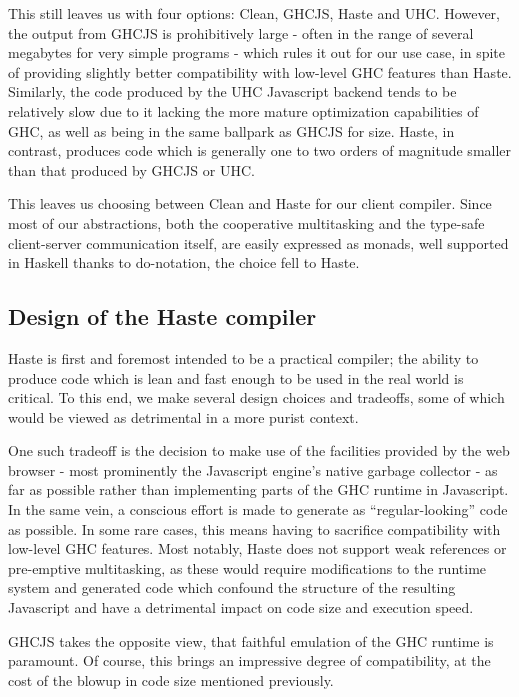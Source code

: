 \documentclass[preprint]{sigplanconf}
\begin{document}
This still leaves us with four options: Clean, GHCJS, Haste and UHC. However,
the output from GHCJS is prohibitively large - often in the range of several
megabytes for very simple programs - which rules it out for our use case, in
spite of providing slightly better compatibility with low-level GHC features
than Haste. Similarly, the code produced by the UHC Javascript backend tends to
be relatively slow due to it lacking the more mature optimization capabilities
of GHC, as well as being in the same ballpark as GHCJS for size. Haste, in
contrast, produces code which is generally one to two orders of magnitude
smaller than that produced by GHCJS or UHC.\ \cite{haste}

This leaves us choosing between Clean and Haste for our client compiler. Since
most of our abstractions, both the cooperative multitasking and the type-safe
client-server communication itself, are easily expressed as monads, well
supported in Haskell thanks to do-notation, the choice fell to Haste.

\subsection{Design of the Haste compiler}

Haste is first and foremost intended to be a practical compiler; the ability
to produce code which is lean and fast enough to be used in the real world is
critical. To this end, we make several design choices and tradeoffs, some of
which would be viewed as detrimental in a more purist context.

One such tradeoff is the decision to make use of the facilities provided by the
web browser - most prominently the Javascript engine's native garbage
collector - as far as possible rather than implementing parts of the GHC
runtime in Javascript. In the same vein, a conscious effort is made to generate
as ``regular-looking'' code as possible. In some rare cases, this means having
to sacrifice compatibility with low-level GHC features. Most notably, Haste
does not support weak references or pre-emptive multitasking, as these would
require modifications to the runtime system and generated code which confound
the structure of the resulting Javascript and have a detrimental impact on code
size and execution speed.

GHCJS takes the opposite view, that faithful emulation of the GHC runtime is
paramount. Of course, this brings an impressive degree of compatibility, at the
cost of the blowup in code size mentioned previously.
\end{document}
